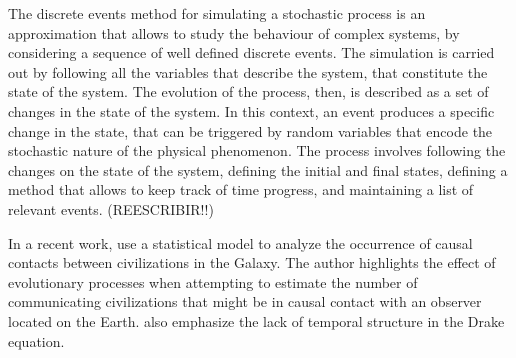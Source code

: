 The discrete events method for simulating a stochastic process is an
approximation that allows to study the behaviour of complex systems,
by considering a sequence of well defined discrete events.
%
The simulation is carried out by following all the variables that
describe the system, that constitute the state of the system.
%
The evolution of the process, then, is described as a set of changes
in the state of the system.
%
In this context, an event produces a specific change in the state,
that can be triggered by random variables that encode the stochastic
nature of the physical phenomenon.
%
The process involves following the changes on the state of the system,
defining the initial and final states, defining a method that allows to
keep track of time progress, and maintaining a list of relevant
events. (REESCRIBIR!!)


In a recent work, \citep{balbi_impact_2018} use a statistical model to
analyze the occurrence of causal contacts between civilizations in the
Galaxy.
%
The author highlights the effect of evolutionary processes when
attempting to estimate the number of communicating civilizations that
might be in causal contact with an observer located on the Earth.
%
\citet{cirkovic_temporal_2004} also emphasize the lack of temporal
structure in the Drake equation.






